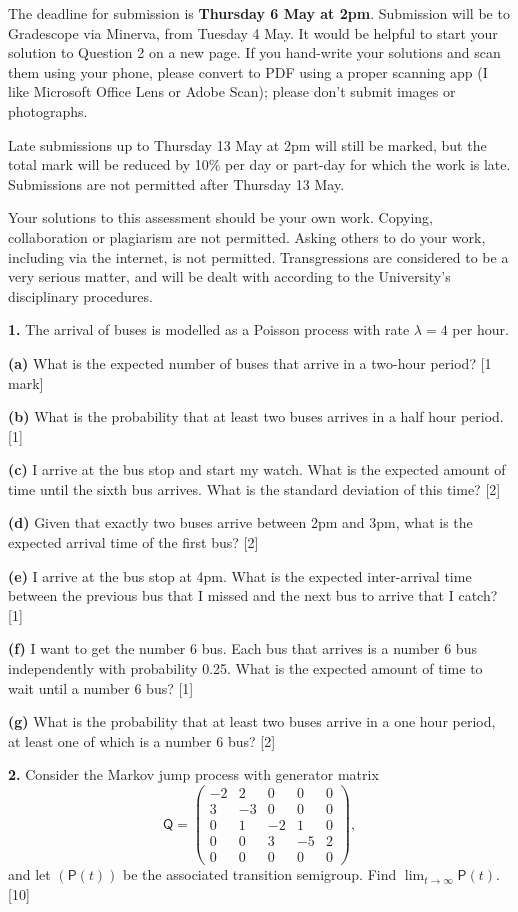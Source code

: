 \documentclass[
  a4paper,
]{article}
\theoremstyle{definition}
\theoremstyle{definition}
\theoremstyle{definition}
\theoremstyle{remark}
\begin{document}
The deadline for submission is \textbf{Thursday 6 May at 2pm}. Submission will be to Gradescope via Minerva, from Tuesday 4 May. It would be helpful to start your solution to Question 2 on a new page. If you hand-write your solutions and scan them using your phone, please convert to PDF using a proper scanning app (I like Microsoft Office Lens or Adobe Scan); please don't submit images or photographs.

Late submissions up to Thursday 13 May at 2pm will still be marked, but the total mark will be reduced by 10\% per day or part-day for which the work is late. Submissions are not permitted after Thursday 13 May.

Your solutions to this assessment should be your own work. Copying, collaboration or plagiarism are not permitted. Asking others to do your work, including via the internet, is not permitted. Transgressions are considered to be a very serious matter, and will be dealt with according to the University's disciplinary procedures.

\textbf{1.} The arrival of buses is modelled as a Poisson process with rate \(\lambda = 4\) per hour.

\textbf{(a)} What is the expected number of buses that arrive in a two-hour period?
{{[}1 mark{]}}

\textbf{(b)} What is the probability that at least two buses arrives in a half hour period.
{{[}1{]}}

\textbf{(c)} I arrive at the bus stop and start my watch. What is the expected amount
of time until the sixth bus arrives. What is the standard deviation of this
time? {{[}2{]}}

\textbf{(d)} Given that exactly two buses arrive between 2pm and 3pm, what is the
expected arrival time of the first bus? {{[}2{]}}

\textbf{(e)} I arrive at the bus stop at 4pm. What is the expected inter-arrival time
between the previous bus that I missed and the next bus to arrive that I
catch? {{[}1{]}}

\textbf{(f)} I want to get the number 6 bus. Each bus that arrives is a number 6 bus
independently with probability 0.25. What is the expected amount of time
to wait until a number 6 bus? {{[}1{]}}

\textbf{(g)} What is the probability that at least two buses arrive in a one hour period, at least one of which is a number 6 bus? {{[}2{]}}

\textbf{2.} Consider the Markov jump process with generator matrix
\[ \mathsf Q = \begin{pmatrix}
-2 &  2 &  0 &  0 &  0 \\
 3 & -3 &  0 &  0 &  0 \\
 0 &  1 & -2 &  1 &  0 \\
 0 &  0 &  3 & -5 &  2 \\
 0 & 0 & 0 & 0 & 0
\end{pmatrix} , \]
and let \((\mathsf P(t))\) be the associated transition semigroup. Find \(\lim_{t \to \infty} \mathsf P(t)\). {{[}10{]}}
\end{document}

